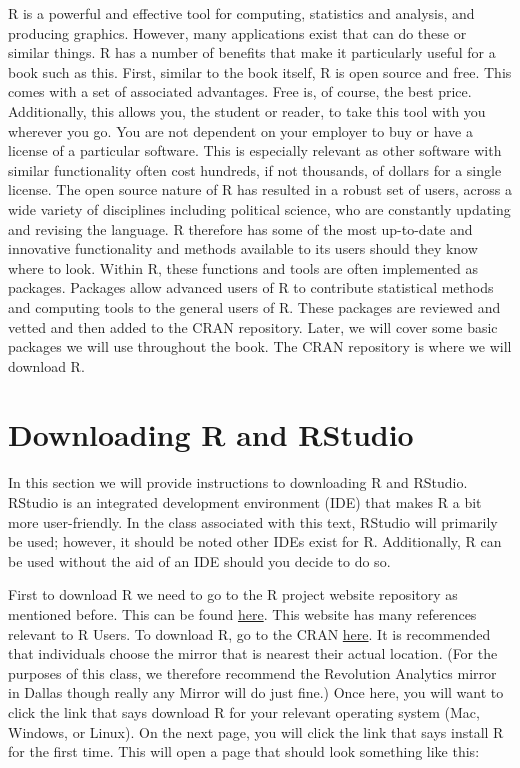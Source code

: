 \documentclass[11pt,openany]{book}\usepackage[]{graphicx}\usepackage[]{color}
\begin{document}
R is a powerful and effective tool for computing, statistics and analysis, and producing graphics. However, many applications exist that can do these or similar things. R has a number of benefits that make it particularly useful for a book such as this. First, similar to the book itself, R is open source and free. This comes with a set of associated advantages. Free is, of course, the best price. Additionally, this allows you, the student or reader, to take this tool with you wherever you go. You are not dependent on your employer to buy or have a license of a particular software. This is especially relevant as other software with similar functionality often cost hundreds, if not thousands, of dollars for a single license. The open source nature of R has resulted in a robust set of users, across a wide variety of disciplines including political science, who are constantly updating and revising the language. R therefore has some of the most up-to-date and innovative functionality and methods available to its users should they know where to look. Within R, these functions and tools are often implemented as packages. Packages allow advanced users of R to contribute statistical methods and computing tools to the general users of R. These packages are reviewed and vetted and then added to the CRAN repository. Later, we will cover some basic packages we will use throughout the book. The CRAN repository is where we will download R.

\section{Downloading R and RStudio}

In this section we will provide instructions to downloading R and RStudio. RStudio is an integrated development environment (IDE) that makes R a bit more user-friendly. In the class associated with this text, RStudio will primarily be used; however, it should be noted other IDEs exist for R. Additionally, R can be used without the aid of an IDE should you decide to do so. 

First to download R we need to go to the R project website repository as mentioned before. This can be found \href{https://www.r-project.org/}{here}. This website has many references relevant to R Users. To download R, go to the CRAN \href{https://cran.r-project.org/mirrors.html}{here}. It is recommended that individuals choose the mirror that is nearest their actual location. (For the purposes of this class, we therefore recommend the Revolution Analytics mirror in Dallas though really any Mirror will do just fine.) Once here, you will want to click the link that says download R for your relevant operating system (Mac, Windows, or Linux). On the next page, you will click the link that says install R for the first time. This will open a page that should look something like this:
\end{document}
